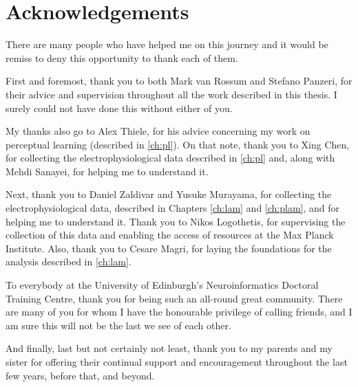 
\begingroup

\let\clearpage\relax
\let\cleardoublepage\relax
\let\cleardoublepage\relax

\chapter*{Acknowledgements} %

There are many people who have helped me on this journey and it would be remiss to deny this opportunity to thank each of them.

First and foremost, thank you to both Mark van Rossum and Stefano Panzeri, for their advice and supervision throughout all the work described in this thesis.
I surely could not have done this without either of you.

My thanks also go to Alex Thiele, for his advice concerning my work on perceptual learning (described in \autoref{ch:pl}).
On that note, thank you to Xing Chen, for collecting the electrophysiological data described in \autoref{ch:pl} and, along with Mehdi Sanayei, for helping me to understand it.

Next, thank you to Daniel Zaldivar and Yusuke Murayama, for collecting the electrophysiological data, described in Chapters \ref{ch:lam} and \ref{ch:plam}, and for helping me to understand it.
Thank you to Nikos Logothetis, for supervising the collection of this data and enabling the access of resources at the Max Planck Institute.
Also, thank you to Cesare Magri, for laying the foundations for the analysis described in \autoref{ch:lam}.

To everybody at the University of Edinburgh's Neuroinformatics Doctoral Training Centre, thank you for being such an all-round great community.
There are many of you for whom I have the honourable privilege of calling friends, and I am sure this will not be the last we see of each other.

And finally, last but not certainly not least, thank you to my parents and my sister for offering their continual support and encouragement throughout the last few years, before that, and beyond.

\endgroup
